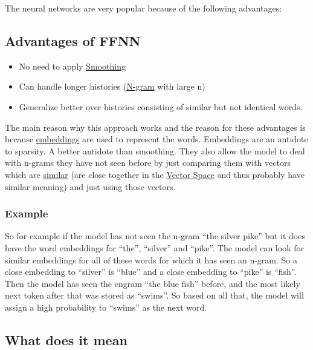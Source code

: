 \documentclass[
  11pt,
  british,
]{article}
\providecommand{\tightlist}{%
  \setlength{\itemsep}{0pt}\setlength{\parskip}{0pt}}
\begin{document}
The neural networks are very popular because of the following
advantages:

\hypertarget{advantages-of-ffnn}{%
\subsection{Advantages of FFNN}\label{advantages-of-ffnn}}

\begin{itemize}
\tightlist
\item
  No need to apply \href{Smoothing.md}{Smoothing}
\item
  Can handle longer histories (\href{../Languages/N-grams.md}{N-gram}
  with large n)
\item
  Generalize better over histories consisting of similar but not
  identical words.
\end{itemize}

The main reason why this approach works and the reason for these
advantages is because
\href{../Semantic-Similarity/Embeddings.md}{embeddings} are used to
represent the words. Embeddings are an antidote to sparsity. A better
antidote than smoothing. They also allow the model to deal with n-grams
they have not seen before by just comparing them with vectors which are
\href{../Semantic-Similarity/Similarity.md}{similar} (are close together
in the \href{../Semantic-Similarity/Vector\%20Space.md}{Vector Space}
and thus probably have similar meaning) and just using those vectors.

\hypertarget{example-3}{%
\subsubsection{Example}\label{example-3}}

So for example if the model has not seen the n-gram ``the silver pike''
but it does have the word embeddings for ``the'', ``silver'' and
``pike''. The model can look for similar embeddings for all of these
words for which it has seen an n-gram. So a close embedding to
``silver'' is ``blue'' and a close embedding to ``pike'' is ``fish''.
Then the model has seen the engram ``the blue fish'' before, and the
most likely next token after that was stored as ``swims''. So based on
all that, the model will assign a high probability to ``swims'' as the
next word.

\hypertarget{what-does-it-mean}{%
\subsection{What does it mean}\label{what-does-it-mean}}
\end{document}

